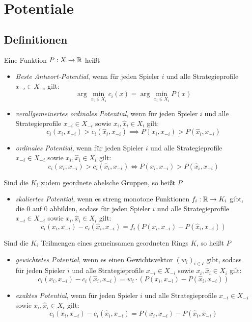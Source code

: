 \section{Potentiale}\label{sec:Potentiale}

\subsection{Definitionen}

\begin{defn}
	Eine Funktion $P: X \to \mathbb{R}$ heißt
	\begin{itemize}
		\item \emph{Beste Antwort-Potential}, wenn für jeden Spieler $i$ und alle Strategieprofile $x_{-i} \in X_{-i}$ gilt:
			\[\arg \min_{x_i \in X_i}c_i(x) = \arg \min_{x_i \in X_i} P(x)\]
		\item \emph{verallgemeinertes ordinales Potential}, wenn für jeden Spieler $i$ und alle Strategieprofile $x_{-i} \in X_{-i}$ sowie $x_i, \hat{x}_i \in X_i$ gilt:
			\[c_i(x_i,x_{-i}) > c_i(\hat{x}_i, x_{-i}) \implies P(x_i,x_{-i}) > P(\hat{x}_i, x_{-i})\]
		\item \emph{ordinales Potential}, wenn für jeden Spieler $i$ und alle Strategieprofile $x_{-i} \in X_{-i}$ sowie $x_i, \hat{x}_i \in X_i$ gilt:
			\[c_i(x_i,x_{-i}) > c_i(\hat{x}_i, x_{-i}) \iff P(x_i,x_{-i}) > P(\hat{x}_i, x_{-i})\]
	\end{itemize}
	Sind die $K_i$ zudem geordnete abelsche Gruppen, so heißt $P$
	\begin{itemize}
		\item \emph{skaliertes Potential}, wenn es streng monotone Funktionen $f_i: \mathbb{R} \to K_i$ gibt, die $0$ auf $0$ abbilden, sodass für jeden Spieler $i$ und alle Strategieprofile $x_{-i} \in X_{-i}$ sowie $x_i, \hat{x}_i \in X_i$ gilt:
			\[c_i(x_i,x_{-i}) - c_i(\hat{x}_i, x_{-i}) = f_i(P(x_i,x_{-i}) - P(\hat{x}_i, x_{-i}))\]
	\end{itemize}
	Sind die $K_i$ Teilmengen eines gemeinsamen geordneten Rings $K$, so heißt $P$
	\begin{itemize}	
		\item \emph{gewichtetes Potential}, wenn es einen Gewichtsvektor $(w_i)_{i\in I}$ gibt, sodass für jeden Spieler $i$ und alle Strategieprofile $x_{-i} \in X_{-i}$ sowie $x_i, \hat{x}_i \in X_i$ gilt:
			\[c_i(x_i,x_{-i}) - c_i(\hat{x}_i, x_{-i}) = w_i\cdot(P(x_i,x_{-i}) - P(\hat{x}_i, x_{-i}))\]
		\item \emph{exaktes Potential}, wenn für jeden Spieler $i$ und alle Strategieprofile $x_{-i} \in X_{-i}$ sowie $x_i, \hat{x}_i \in X_i$ gilt:
			\[c_i(x_i,x_{-i}) - c_i(\hat{x}_i, x_{-i}) = P(x_i,x_{-i}) - P(\hat{x}_i, x_{-i})\]
	\end{itemize}
\end{defn}

